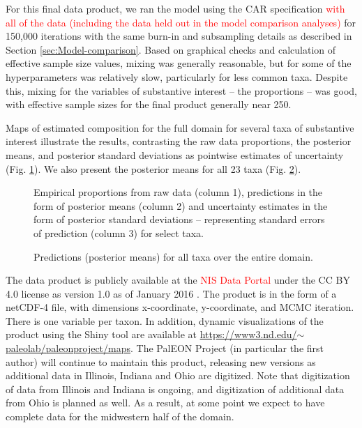 \documentclass[12pt]{article}\usepackage[]{graphicx}\usepackage[]{color}
\begin{document}
For this final data product, we ran the model using the CAR specification
\textcolor{red}{with all of the data (including the data held out
in the model comparison analyses)} for 150,000 iterations with the
same burn-in and subsampling details as described in Section \ref{sec:Model-comparison}.
Based on graphical checks and calculation of effective sample size
values, mixing was generally reasonable, but for some of the hyperparameters
was relatively slow, particularly for less common taxa. Despite this,
mixing for the variables of substantive interest -- the proportions
-- was good, with effective sample sizes for the final product generally
near 250.

Maps of estimated composition for the full domain for several taxa
of substantive interest illustrate the results, contrasting the raw
data proportions, the posterior means, and posterior standard deviations
as pointwise estimates of uncertainty (Fig. \ref{fig:select_maps}).
We also present the posterior means for all 23 taxa (Fig. \ref{fig:all_predictions}).

\begin{figure}
\hspace{4mm}\hspace{4mm}\hspace{3.5mm}

\caption{Empirical proportions from raw data (column 1), predictions in the
form of posterior means (column 2) and uncertainty estimates in the
form of posterior standard deviations -- representing standard errors
of prediction (column 3) for select taxa. \label{fig:select_maps}}
\end{figure}


\begin{figure}
\caption{Predictions (posterior means) for all taxa over the entire domain.\label{fig:all_predictions}}


\end{figure}


The data product is publicly available at the \textcolor{red}{NIS
Data Portal }under the CC BY 4.0 license as version 1.0 as of January
2016 \citep{paci:etal:data:2016}. The product is in the form of a
netCDF-4 file, with dimensions x-coordinate, y-coordinate, and MCMC
iteration. There is one variable per taxon. In addition, dynamic visualizations
of the product using the Shiny tool are available at \href{https://www3.nd.edu/~paleolab/paleonproject/maps}{https://www3.nd.edu/$\sim$paleolab/paleonproject/maps}.
The PalEON Project (in particular the first author) will continue
to maintain this product, releasing new versions as additional data
in Illinois, Indiana and Ohio are digitized. Note that digitization
of data from Illinois and Indiana is ongoing, and digitization of
additional data from Ohio is planned as well. As a result, at some
point we expect to have complete data for the midwestern half of the
domain. 
\end{document}

